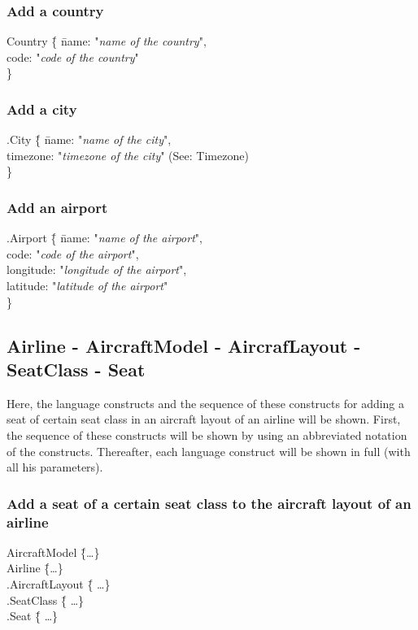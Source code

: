 \documentclass[a4paper,11pt]{article}
\begin{document}
\subsubsection*{Add a country}
\begin{tabbing}
Country \= \{ \= name: "\textit{name of the country}", \\
	\> \> code: "\textit{code of the country}" \\
\> \} \\
\end{tabbing}

\subsubsection*{Add a city}
\begin{tabbing}
.City \= \{ \= name: "\textit{name of the city}", \\
	\> \> timezone: "\textit{timezone of the city}" (See:\renewcommand\refname{} \refname{Timezone}) \\
\> \} \\
\end{tabbing}

\subsubsection*{Add an airport}
\begin{tabbing}
.Airport \= \{ \= name: "\textit{name of the airport}", \\
	\> \> code: "\textit{code of the airport}", \\
	\> \> longitude: "\textit{longitude of the airport}", \\
	\> \> latitude: "\textit{latitude of the airport}" \\
\> \} \\
\end{tabbing}

\subsection*{Airline - AircraftModel - AircrafLayout - SeatClass - Seat}
Here, the language constructs and the sequence of these constructs for adding a seat of certain seat class in an aircraft layout of an airline will be shown. First, the sequence of these constructs will be shown by using an abbreviated notation of the constructs. Thereafter, each language construct will be shown in full (with all his parameters).

\subsubsection*{Add a seat of a certain seat class to the aircraft layout of an airline}
\begin{tabbing}
AircraftModel \= \{\ldots \} \\

Airline \= \{\ldots \} \\
\> .AircraftLayout \= \{ \ldots \} \\
\> \> .SeatClass \= \{ \ldots \} \\
\> \> \> .Seat \= \{ \ldots \} \\
\end{tabbing}
\end{document}
